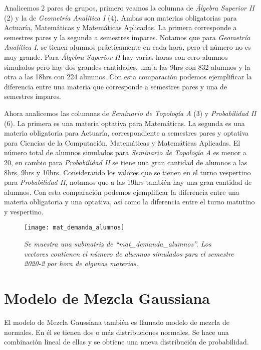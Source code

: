 Analicemos 2 pares de grupos, primero veamos la columna de \textit{Álgebra Superior II} (2) y la de \textit{Geometría Analítica I} (4). Ambas son materias obligatorias para Actuaría, Matemáticas y Matemáticas Aplicadas. La primera corresponde a semestres pares y la segunda a semestres impares. Notamos que para \textit{Geometría Analítica I}, se tienen alumnos prácticamente en cada hora, pero el número no es muy grande. Para \textit{Álgebra Superior II} hay varias horas con cero alumnos simulados pero hay dos grandes cantidades, una a las 9hrs con 832 alumnos y la otra a las 18hrs con 224 alumnos. Con esta comparación podemos ejemplificar la diferencia entre una materia que corresponde a semestres pares y una de semestres impares.

Ahora analicemos las columnas de \textit{Seminario de Topología A} (3) y \textit{Probabilidad II} (6). La primera es una materia optativa para Matemáticas. La segunda es una materia obligatoria para Actuaría, correspondiente a semestres pares y optativa para Ciencias de la Computación, Matemáticas y Matemáticas Aplicadas. El número total de alumnos simulados para \textit{Seminario de Topología A} es menor a 20, en cambio para \textit{Probabilidad II} se tiene una gran cantidad de alumnos a las 8hrs, 9hrs y 10hrs. Considerando los valores que se tienen en el turno vespertino para \textit{Probabilidad II}, notamos que a las 19hrs también hay una gran cantidad de alumnos. Con esta comparación podemos ejemplificar la diferencia entre una materia obligatoria y una optativa, así como la diferencia entre el turno matutino y vespertino.


\begin{figure}[H]
\centering
\texttt{[image: mat\_demanda\_alumnos]} %
\caption[\textit{Ejemplo de matriz con demanda simulada para el 2020-2}]{\textit{Se muestra una submatriz de ``mat\_demanda\_alumnos''. Los vectores contienen el número de alumnos simulados para el semestre 2020-2 por hora de algunas materias.}}\label{matDemandaAlum}
\end{figure}


\section{Modelo de Mezcla Gaussiana} \label{sec_GMM}

El modelo de Mezcla Gaussiana también es llamado modelo de mezcla de normales. En él se tienen dos o más distribuciones normales. Se hace una combinación lineal de ellas y se obtiene una nueva distribución de probabilidad.

